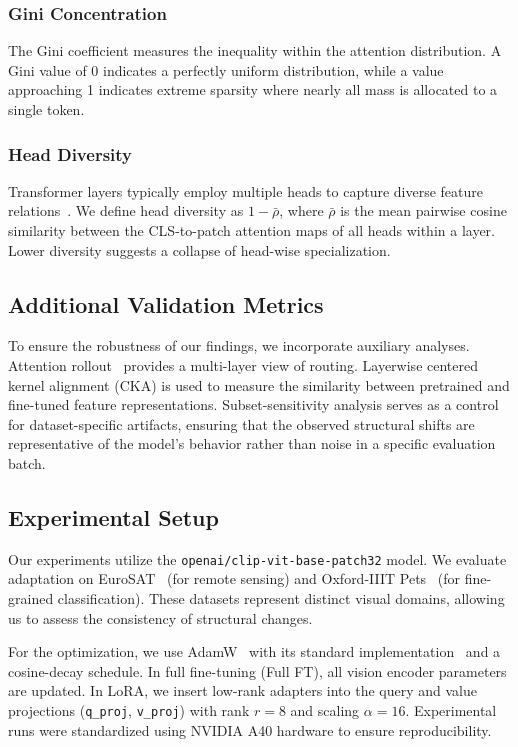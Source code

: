 \documentclass[ai,article,submit,pdftex,oneauthor]{Definitions/mdpi}
\begin{document}
\subsubsection{Gini Concentration}
The Gini coefficient measures the inequality within the attention distribution. A Gini value of 0 indicates a perfectly uniform distribution, while a value approaching 1 indicates extreme sparsity where nearly all mass is allocated to a single token.

\subsubsection{Head Diversity}
Transformer layers typically employ multiple heads to capture diverse feature relations~\cite{vaswani2017attention}. We define head diversity as $1 - \bar{\rho}$, where $\bar{\rho}$ is the mean pairwise cosine similarity between the CLS-to-patch attention maps of all heads within a layer. Lower diversity suggests a collapse of head-wise specialization.

\subsection{Additional Validation Metrics}
To ensure the robustness of our findings, we incorporate auxiliary analyses. Attention rollout~\cite{abnar2020quantifying} provides a multi-layer view of routing. Layerwise centered kernel alignment (CKA) is used to measure the similarity between pretrained and fine-tuned feature representations. Subset-sensitivity analysis serves as a control for dataset-specific artifacts, ensuring that the observed structural shifts are representative of the model's behavior rather than noise in a specific evaluation batch.

\subsection{Experimental Setup}
Our experiments utilize the \texttt{openai/clip-vit-base-patch32} model. We evaluate adaptation on EuroSAT~\cite{helber2019eurosat} (for remote sensing) and Oxford-IIIT Pets~\cite{parkhi2012cats} (for fine-grained classification). These datasets represent distinct visual domains, allowing us to assess the consistency of structural changes.

For the optimization, we use AdamW~\cite{loshchilov2019decoupled} with its standard implementation~\cite{kingma2015adam} and a cosine-decay schedule. In full fine-tuning (Full FT), all vision encoder parameters are updated. In LoRA, we insert low-rank adapters into the query and value projections (\texttt{q\_proj}, \texttt{v\_proj}) with rank $r=8$ and scaling $\alpha=16$. Experimental runs were standardized using NVIDIA A40 hardware to ensure reproducibility.
\end{document}
